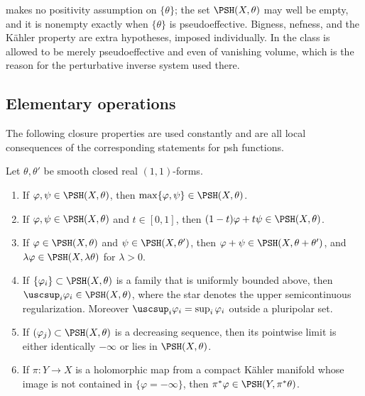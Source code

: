 \begin{remark}
\label{rem:ch51-no-positivity-assumed}
 makes no positivity assumption on
\(\{\theta\}\); the set \(\PSH(X,\theta)\) may well be empty, and it is
nonempty exactly when \(\{\theta\}\) is pseudoeffective.  Bigness,
nefness, and the K\"ahler property are extra hypotheses, imposed
individually.  In  the class is allowed
to be merely pseudoeffective and even of vanishing volume, which is the
reason for the perturbative inverse system used there.
\end{remark}

\subsection{Elementary operations}
\label{sec:ch51-operations}

The following closure properties are used constantly and are all local
consequences of the corresponding statements for psh functions.

\begin{proposition}\label{prop:ch51-psh-operations}
Let \(\theta,\theta'\) be smooth closed real \((1,1)\)-forms.
\begin{enumerate}
\item\label{itm:ch51-op:max}
      If \(\varphi,\psi\in\PSH(X,\theta)\), then
      \(\max\{\varphi,\psi\}\in\PSH(X,\theta)\).
\item\label{itm:ch51-op:convex}
      If \(\varphi,\psi\in\PSH(X,\theta)\) and \(t\in[0,1]\), then
      \((1-t)\varphi+t\psi\in\PSH(X,\theta)\).
\item\label{itm:ch51-op:sum}
      If \(\varphi\in\PSH(X,\theta)\) and \(\psi\in\PSH(X,\theta')\),
      then \(\varphi+\psi\in\PSH(X,\theta+\theta')\), and
      \(\lambda\varphi\in\PSH(X,\lambda\theta)\) for \(\lambda>0\).
\item\label{itm:ch51-op:sup}
      If \(\{\varphi_i\}\subset\PSH(X,\theta)\) is a family that is
      uniformly bounded above, then
      \(\uscsup_i\varphi_i\in\PSH(X,\theta)\), where the star denotes the
      upper semicontinuous regularization.  Moreover
      \(\uscsup_i\varphi_i=\sup_i\varphi_i\) outside a pluripolar set.
\item\label{itm:ch51-op:decreasing}
      If \((\varphi_j)\subset\PSH(X,\theta)\) is a decreasing sequence,
      then its pointwise limit is either identically \(-\infty\) or lies
      in \(\PSH(X,\theta)\).
\item\label{itm:ch51-op:pullback}
      If \(\pi:Y\to X\) is a holomorphic map from a compact K\"ahler
      manifold whose image is not contained in \(\{\varphi=-\infty\}\),
      then \(\pi^*\varphi\in\PSH(Y,\pi^*\theta)\).
\end{enumerate}
\end{proposition}

